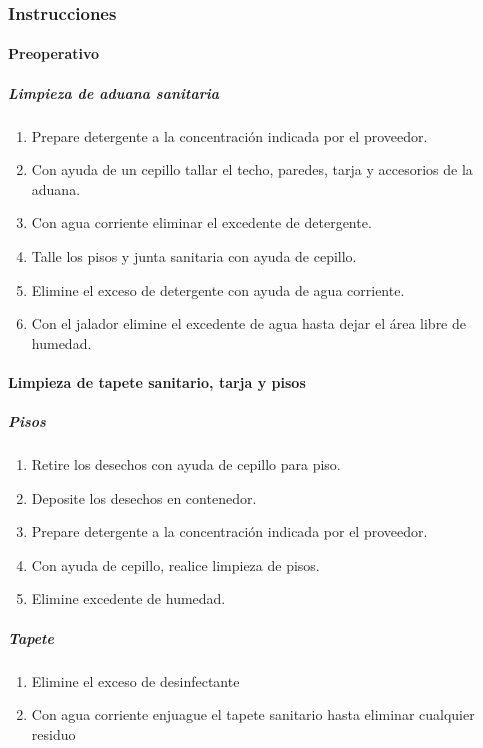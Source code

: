 \subsubsection{Instrucciones}

\paragraph{Preoperativo}

\subparagraph{Limpieza de aduana sanitaria}

\begin{enumerate}
	\item Prepare detergente a la concentración indicada por el proveedor.
	\item Con ayuda de un cepillo tallar el techo, paredes, tarja y accesorios de la aduana.
	\item Con agua corriente eliminar el excedente de detergente.
	\item Talle los pisos y junta sanitaria con ayuda de cepillo.
	\item Elimine el exceso de detergente con ayuda de agua corriente.
	\item Con el jalador elimine el excedente de agua hasta dejar el área libre de humedad.
\end{enumerate}

\paragraph{Limpieza de tapete sanitario, tarja y pisos}

\subparagraph{Pisos}

\begin{enumerate}
	\item Retire los desechos con ayuda de cepillo para piso.
	\item Deposite los desechos en contenedor.
	\item Prepare detergente a la concentración indicada por el proveedor.
	\item Con ayuda de cepillo, realice limpieza de pisos.
	\item Elimine excedente de humedad.
\end{enumerate}

\subparagraph{Tapete}

\begin{enumerate}
	\item Elimine el exceso de desinfectante
	\item Con agua corriente enjuague el tapete sanitario hasta eliminar cualquier residuo
\end{enumerate}

